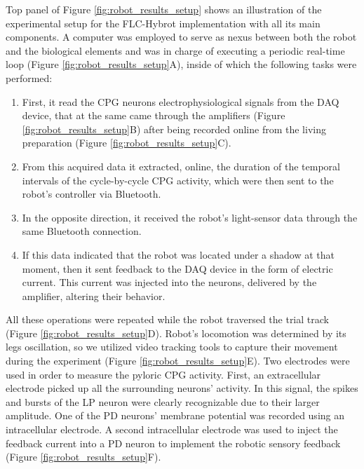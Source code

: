 Top panel of Figure \ref{fig:robot_results_setup} shows an illustration of the experimental setup for the FLC-Hybrot implementation with all its main components. A computer was employed to serve as nexus between both the robot and the biological elements and was in charge of executing a periodic real-time loop (Figure \ref{fig:robot_results_setup}A), inside of which the following tasks were performed:
\begin{enumerate}
	\item First, it read the CPG neurons electrophysiological signals from the DAQ device, that at the same came through the amplifiers (Figure \ref{fig:robot_results_setup}B) after being recorded online from the living preparation (Figure \ref{fig:robot_results_setup}C).
	\item From this acquired data it extracted, online, the duration of the temporal intervals of the cycle-by-cycle CPG activity, which were then sent to the robot's controller via Bluetooth.
	\item In the opposite direction, it received the robot's light-sensor data through the same Bluetooth connection.
	\item If this data indicated that the robot was located under a shadow at that moment, then it sent feedback to the DAQ device in the form of electric current. This current was injected into the neurons, delivered by the amplifier, altering their behavior.
\end{enumerate}

All these operations were repeated while the robot traversed the trial track (Figure \ref{fig:robot_results_setup}D). Robot's locomotion was determined by its legs oscillation, so we utilized video tracking tools to capture their movement during the experiment (Figure \ref{fig:robot_results_setup}E). Two electrodes were used in order to measure the pyloric CPG activity. First, an extracellular electrode picked up all the surrounding neurons' activity. In this signal, the spikes and bursts of the LP neuron were clearly recognizable due to their larger amplitude. One of the PD neurons' membrane potential was recorded using an intracellular electrode. A second intracellular electrode was used to inject the feedback current into a PD neuron to implement the robotic sensory feedback (Figure \ref{fig:robot_results_setup}F).

